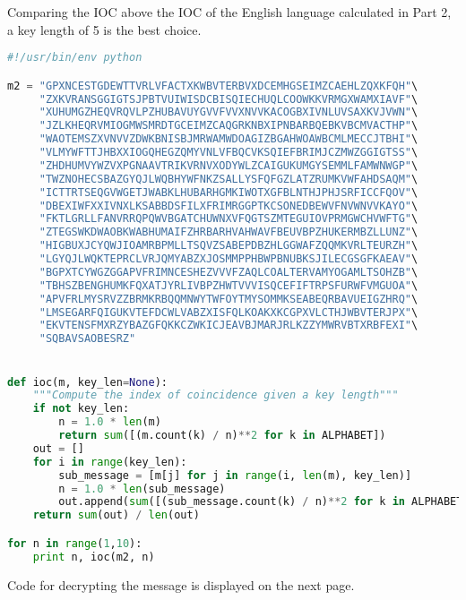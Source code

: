 \documentclass[12pt]{article}
\begin{document}
Comparing the IOC above the IOC of the English language calculated in Part 2, a key length of 5 is the best choice.

\begin{lstlisting}[language=Python, caption=Code for computing the key length from question 3]
#!/usr/bin/env python

m2 = "GPXNCESTGDEWTTVRLVFACTXKWBVTERBVXDCEMHGSEIMZCAEHLZQXKFQH"\
     "ZXKVRANSGGIGTSJPBTVUIWISDCBISQIECHUQLCOOWKKVRMGXWAMXIAVF"\
     "XUHUMGZHEQVRQVLPZHUBAVUYGVVFVVXNVVKACOGBXIVNLUVSAXKVJVWN"\
     "JZLKHEQRVMIOGMWSMRDTGCEIMZCAQGRKNBXIPNBARBQEBKVBCMVACTHP"\
     "WAOTEMSZXVNVVZDWKBNISBJMRWAMWDOAGIZBGAHWOAWBCMLMECCJTBHI"\
     "VLMYWFTTJHBXXIOGQHEGZQMYVNLVFBQCVKSQIEFBRIMJCZMWZGGIGTSS"\
     "ZHDHUMVYWZVXPGNAAVTRIKVRNVXODYWLZCAIGUKUMGYSEMMLFAMWNWGP"\
     "TWZNOHECSBAZGYQJLWQBHYWFNKZSALLYSFQFGZLATZRUMKVWFAHDSAQM"\
     "ICTTRTSEQGVWGETJWABKLHUBARHGMKIWOTXGFBLNTHJPHJSRFICCFQOV"\
     "DBEXIWFXXIVNXLKSABBDSFILXFRIMRGGPTKCSONEDBEWVFNVWNVVKAYO"\
     "FKTLGRLLFANVRRQPQWVBGATCHUWNXVFQGTSZMTEGUIOVPRMGWCHVWFTG"\
     "ZTEGSWKDWAOBKWABHUMAIFZHRBARHVAHWAVFBEUVBPZHUKERMBZLLUNZ"\
     "HIGBUXJCYQWJIOAMRBPMLLTSQVZSABEPDBZHLGGWAFZQQMKVRLTEURZH"\
     "LGYQJLWQKTEPRCLVRJQMYABZXJOSMMPPHBWPBNUBKSJILECGSGFKAEAV"\
     "BGPXTCYWGZGGAPVFRIMNCESHEZVVVFZAQLCOALTERVAMYOGAMLTSOHZB"\
     "TBHSZBENGHUMKFQXATJYRLIVBPZHWTVVVISQCEFIFTRPSFURWFVMGUOA"\
     "APVFRLMYSRVZZBRMKRBQQMNWYTWFOYTMYSOMMKSEABEQRBAVUEIGZHRQ"\
     "LMSEGARFQIGUKVTEFDCWLVABZXISFQLKOAKXKCGPXVLCTHJWBVTERJPX"\
     "EKVTENSFMXRZYBAZGFQKKCZWKICJEAVBJMARJRLKZZYMWRVBTXRBFEXI"\
     "SQBAVSAOBESRZ"


def ioc(m, key_len=None):
    """Compute the index of coincidence given a key length"""
    if not key_len:
        n = 1.0 * len(m)
        return sum([(m.count(k) / n)**2 for k in ALPHABET])
    out = []
    for i in range(key_len):
        sub_message = [m[j] for j in range(i, len(m), key_len)]
        n = 1.0 * len(sub_message)
        out.append(sum([(sub_message.count(k) / n)**2 for k in ALPHABET]))
    return sum(out) / len(out)

for n in range(1,10):
    print n, ioc(m2, n)
\end{lstlisting}


Code for decrypting the message is displayed on the next page.
\end{document}
